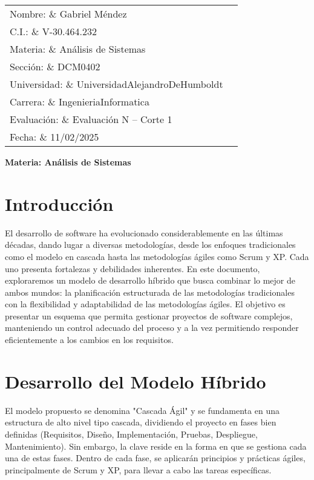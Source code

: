 \documentclass[12pt, spanish]{article}
\begin{document}
\begin{tabular}{ll}
Nombre: \& Gabriel Méndez \\
C.I.: \& V-30.464.232 \\
Materia: \& Análisis de Sistemas \\
Sección: \& DCM0402 \\
Universidad: \& UniversidadAlejandroDeHumboldt \\
Carrera: \& IngenieriaInformatica \\
Evaluación: \& Evaluación N\textdegree1 – Corte 1 \\
Fecha: \& 11/02/2025
\end{tabular}

\vspace{2cm}
\begin{center}
\Large \textbf{{Materia: Análisis de Sistemas}}
\end{center}

\section*{Introducción}

El desarrollo de software ha evolucionado considerablemente en las últimas décadas, dando lugar a diversas metodologías, desde los enfoques tradicionales como el modelo en cascada hasta las metodologías ágiles como Scrum y XP. Cada uno presenta fortalezas y debilidades inherentes.  En este documento, exploraremos un modelo de desarrollo híbrido que busca combinar lo mejor de ambos mundos: la planificación estructurada de las metodologías tradicionales con la flexibilidad y adaptabilidad de las metodologías ágiles. El objetivo es presentar un esquema que permita gestionar proyectos de software complejos, manteniendo un control adecuado del proceso y a la vez permitiendo responder eficientemente a los cambios en los requisitos.

\section*{Desarrollo del Modelo Híbrido}

El modelo propuesto se denomina "Cascada Ágil" y se fundamenta en una estructura de alto nivel tipo cascada, dividiendo el proyecto en fases bien definidas (Requisitos, Diseño, Implementación, Pruebas, Despliegue, Mantenimiento).  Sin embargo, la clave reside en la forma en que se gestiona cada una de estas fases.  Dentro de cada fase, se aplicarán principios y prácticas ágiles, principalmente de Scrum y XP, para llevar a cabo las tareas específicas.
\end{document}

